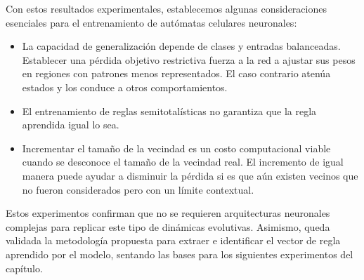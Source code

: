 Con estos resultados experimentales, establecemos algunas consideraciones esenciales para el entrenamiento de autómatas celulares neuronales:

\begin{itemize}
	\item La capacidad de generalización depende de clases y entradas balanceadas. Establecer una pérdida objetivo restrictiva fuerza a la red a ajustar sus pesos en regiones con patrones menos representados. El caso contrario atenúa estados y los conduce a otros comportamientos. 
	
	\item El entrenamiento de reglas semitotalísticas no garantiza que la regla aprendida igual lo sea. 

	\item Incrementar el tamaño de la vecindad es un costo computacional viable cuando se desconoce el tamaño de la vecindad real. El incremento de igual manera puede ayudar a disminuir la pérdida si es que aún existen vecinos que no fueron considerados pero con un límite contextual.

\end{itemize}

Estos experimentos confirman que no se requieren arquitecturas neuronales complejas para replicar este tipo de dinámicas evolutivas. Asimismo, queda validada la metodología propuesta para extraer e identificar el vector de regla aprendido por el modelo, sentando las bases para los siguientes experimentos del capítulo.
